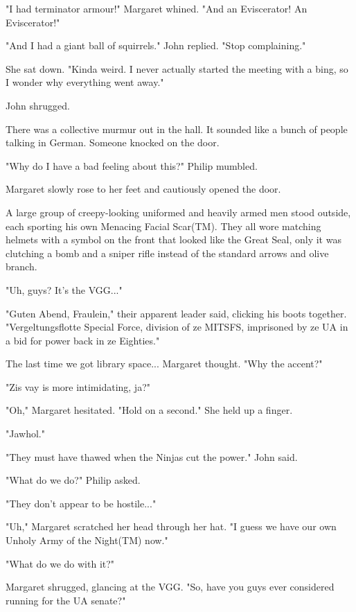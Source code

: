 \documentclass[10pt]{article}
\begin{document}
"I had terminator armour!" Margaret whined. "And an Eviscerator! An Eviscerator!"

"And I had a giant ball of squirrels." John replied. "Stop complaining."

She sat down. "Kinda weird. I never actually started the meeting with a bing, so I wonder why everything went away."

John shrugged.

There was a collective murmur out in the hall. It sounded like a bunch of people talking in German. Someone knocked on the door.

"Why do I have a bad feeling about this?" Philip mumbled. 

Margaret slowly rose to her feet and cautiously opened the door.

A large group of creepy-looking uniformed and heavily armed men stood outside, each sporting his own Menacing Facial Scar(TM). They all wore matching helmets with a symbol on the front that looked like the Great Seal, only it was clutching a bomb and a sniper rifle instead of the standard arrows and olive branch.

"Uh, guys? It's the VGG..."

"Guten Abend, Fraulein," their apparent leader said, clicking his boots together. "Vergeltungsflotte Special Force, division of ze MITSFS, imprisoned by ze UA in a bid for power back in ze Eighties."

The last time we got library space... Margaret thought. "Why the accent?"

"Zis vay is more intimidating, ja?"

"Oh," Margaret hesitated. "Hold on a second." She held up a finger.

"Jawhol."

"They must have thawed when the Ninjas cut the power." John said.

"What do we do?" Philip asked.

"They don't appear to be hostile..."

"Uh," Margaret scratched her head through her hat. "I guess we have our own Unholy Army of the Night(TM) now."

"What do we do with it?"

Margaret shrugged, glancing at the VGG. "So, have you guys ever considered running for the UA senate?"
\end{document}
